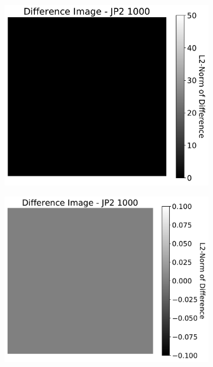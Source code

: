 \begin{figure}[htb]
\begin{subfigure}[b]{0.48\textwidth}
        \caption{}
        \label{fig:img_quality_comp_jp2_1000_center_histo}
    \end{subfigure}
    \\
    \begin{subfigure}[b]{0.48\textwidth}
        \centering
        \includegraphics[width=\textwidth]{doc/thesis/0_figures/compare_quality/set1/jp2_1000_center_diff_heatmap}
        \caption{}
        \label{fig:img_quality_comp_jp2_1000_center_diff}
    \end{subfigure}
    \begin{subfigure}[b]{0.48\textwidth}
        \centering
        \includegraphics[width=\textwidth]{doc/thesis/0_figures/compare_quality/set1/jp2_1000_center_diff_heatmap_rel}

\end{subfigure}
\end{figure}
